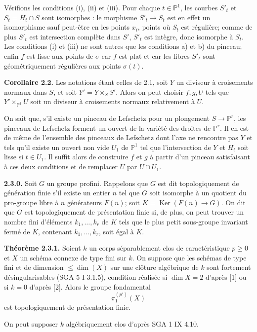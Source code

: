 \documentclass[11pt]{article}
\providecommand{\Ker}{\operatorname{Ker}}
\begin{document}
Vérifions les conditions (i), (ii) et (iii). Pour chaque $t\in\mathbb P^1$, les courbes $S'_t$ et $S_t=H_t\cap S$ sont isomorphes : le morphisme $S'_t\to S_t$ est en effet un isomorphisme sauf peut-être en les points $x_i$, points où $S_t$ est régulière; comme de plus $S'_t$ est intersection complète dans $S'$, $S'_t$ est intègre, donc isomorphe à $S_t$. Les conditions (i) et (iii) ne sont autres que les conditions a) et b) du pinceau; enfin $f$ est lisse aux points de $\sigma$ car $f$ est plat et car les fibres $S'_t$ sont géométriquement régulières aux points $\sigma(t)$.

\textbf{Corollaire 2.2.} Les notations étant celles de 2.1, soit $Y$ un diviseur à croisements normaux dans $S$, et soit $Y'=Y\times_S S'$. Alors on peut choisir $f,g,U$ tels que $Y'\times_{\mathbb P^1}U$ soit un diviseur à croisements normaux relativement à $U$.

On sait que, s'il existe un pinceau de Lefschetz pour un plongement $S\to\mathbb P^r$, les pinceaux de Lefschetz forment un ouvert de la variété des droites de $\mathbb P^r$. Il en est de même de l'ensemble des pinceaux de Lefschetz dont l'axe ne rencontre pas $Y$ et tels qu'il existe un ouvert non vide $U_1$ de $\mathbb P^1$ tel que l'intersection de $Y$ et $H_t$ soit lisse si $t\in U_1$. Il suffit alors de construire $f$ et $g$ à partir d'un pinceau satisfaisant à ces deux conditions et de remplacer $U$ par $U\cap U_1$.

\textbf{2.3.0.} Soit $G$ un groupe profini. Rappelons que $G$ est dit topologiquement de génération finie s'il existe un entier $n$ tel que $G$ soit isomorphe à un quotient du pro-groupe libre à $n$ générateurs $F(n)$; soit $K=\Ker(F(n)\to G)$. On dit que $G$ est topologiquement de présentation finie si, de plus, on peut trouver un nombre fini d'éléments $k_1,\ldots,k_r$ de $K$ tels que le plus petit sous-groupe invariant fermé de $K$, contenant $k_1,\ldots,k_r$, soit égal à $K$.

\textbf{Théorème 2.3.1.} Soient $k$ un corps séparablement clos de caractéristique $p\ge0$ et $X$ un schéma connexe de type fini sur $k$. On suppose que les schémas de type fini et de dimension $\le \dim(X)$ sur une clôture algébrique de $k$ sont fortement désingularisables (SGA 5 I 3.1.5), condition réalisée si $\dim X=2$ d'après [1] ou si $k=0$ d'après [2]. Alors le groupe fondamental
\[
 \pi_1^{(p')}(X)
\]
est topologiquement de présentation finie.

On peut supposer $k$ algébriquement clos d'après SGA 1 IX 4.10.
\end{document}
